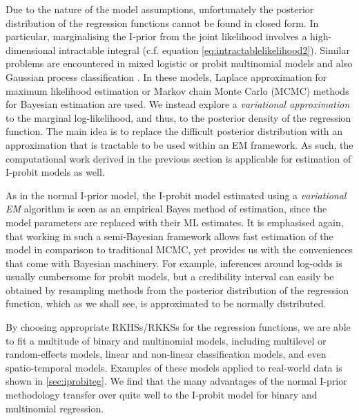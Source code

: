 \documentclass[showframe,11pt,twoside,openright]{report}
\begin{document}

Due to the nature of the model assumptions, unfortunately the posterior distribution of the regression functions cannot be found in closed form.
In particular, marginalising the I-prior from the joint likelihood involves a high-dimensional intractable integral (c.f. equation \ref{eq:intractablelikelihood2}).
Similar problems are encountered in mixed logistic or probit multinomial models \citep{breslow1993approximate,mcculloch2000bayesian} and also Gaussian process classification \citep{neal1999,rasmussen2006gaussian}.
In these models, Laplace approximation for maximum likelihood estimation or Markov chain Monte Carlo (MCMC) methods for Bayesian estimation are used. 
We instead explore a \emph{variational approximation} to the marginal log-likelihood, and thus, to the posterior density of the regression function.
The main idea is to replace the difficult posterior distribution with an approximation that is tractable to be used within an EM framework.
As such, the computational work derived in the previous section is applicable for estimation of I-probit models as well.

As in the normal I-prior model, the I-probit model estimated using a \emph{variational EM} algorithm is seen as an empirical Bayes method of estimation, since the model parameters are replaced with their ML estimates.
It is emphasised again, that working in such a semi-Bayesian framework allows fast estimation of the model in comparison to traditional MCMC, yet provides us with the conveniences that come with Bayesian machinery.
For example, inferences around log-odds is usually cumbersome for probit models, but a credibility interval can easily be obtained by resampling methods from the posterior distribution of the regression function, which as we shall see, is approximated to be normally distributed.

By choosing appropriate RKHSs/RKKSs for the regression functions, we are able to fit a multitude of binary and multinomial models, including multilevel or random-effects models, linear and non-linear classification models, and even spatio-temporal models.
Examples of these models applied to real-world data is shown in  \cref{sec:iprobiteg}.
We find that the many advantages of the normal I-prior methodology  transfer over quite well to the I-probit model for binary and multinomial regression.
\end{document}
